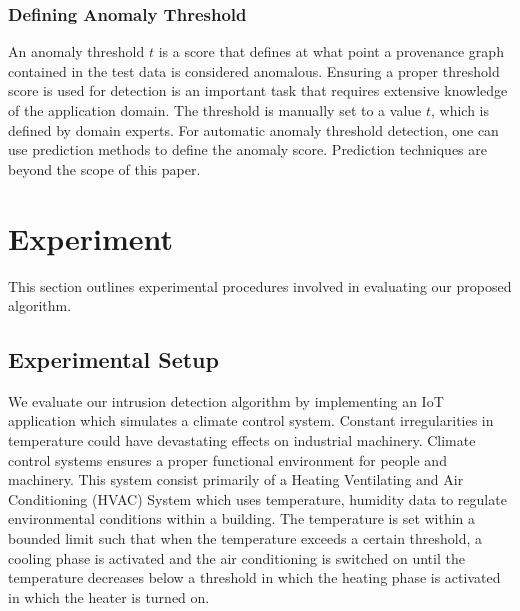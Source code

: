 



\subsubsection{Defining Anomaly Threshold}

An anomaly threshold $t$ is a score that defines at what point a provenance graph contained in the test data is considered anomalous. Ensuring a proper threshold score is used for detection is an important task that requires extensive knowledge of the application domain. The threshold is manually set to a value $t$, which is defined by domain experts. For automatic anomaly threshold detection, one can use prediction methods to define the anomaly score. Prediction techniques are beyond the scope of this paper. 

%






\section{Experiment}

This section outlines experimental procedures involved in evaluating our proposed algorithm. 


\subsection{Experimental Setup}

We evaluate our intrusion detection algorithm by implementing an IoT application which simulates a climate control system. Constant irregularities in temperature could have devastating effects on industrial machinery. Climate control systems ensures a proper functional environment for people and machinery. This system consist primarily of a Heating Ventilating and Air Conditioning (HVAC) System which uses temperature, humidity data to regulate environmental conditions within a building. The temperature is set within a bounded limit such that when the temperature exceeds a certain threshold, a cooling phase is activated and the air conditioning is switched on until the temperature decreases below a threshold in which the heating phase is activated in which the heater is turned on.


